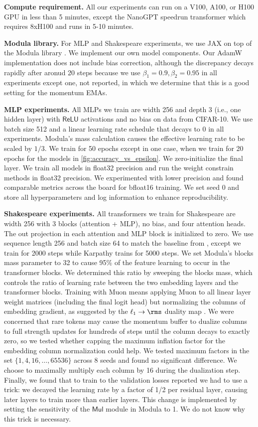 \textbf{Compute requirement.} All our experiments can run on a V100, A100, or H100 GPU in less than 5 minutes, except the NanoGPT speedrun transformer which requires 8xH100 and runs in 5-10 minutes.

\textbf{Modula library.} For MLP and Shakespeare experiments, we use JAX \citep{jax2018github} on top of the Modula library \citep{large2024,modula-docs}. We implement our own model components. Our AdamW implementation does not include bias correction, although the discrepancy decays rapidly after aronud 20 steps because we use $\beta_1 = 0.9, \beta_2 = 0.95$ in all experiments except one, not reported, in which we determine that this is a good setting for the momentum EMAs.

\textbf{MLP experiments.} All MLPs we train are width 256 and depth 3 (i.e., one hidden layer) with $\mathsf{ReLU}$ activations and no bias on data from CIFAR-10. We use batch size 512 and a linear learning rate schedule that decays to 0 in all experiments. Modula's mass calculation causes the effective learning rate to be scaled by $1/3$. We train for 50 epochs except in one case, when we train for 20 epochs for the models in \cref{fig:accuracy_vs_epsilon}. We zero-initialize the final layer. We train all models in float32 precision and run the weight constrain methods in float32 precision. We experimented with lower precision and found comparable metrics across the board for bfloat16 training. We set seed 0 and store all hyperparameters and log information to enhance reproducibility.

\textbf{Shakespeare experiments.} All transformers we train for Shakespeare are width 256 with 3 blocks (attention + MLP), no bias, and four attention heads. The out projection in each attention and MLP block is initialized to zero. We use sequence length 256 and batch size 64 to match the baseline from \citep{karpathy_nanoGPT}, except we train for 2000 steps while Karpathy trains for 5000 steps. We set Modula's blocks mass parameter to 32 to cause 95\% of the feature learning to occur in the transformer blocks. We determined this ratio by sweeping the blocks mass, which controls the ratio of learning rate between the two embedding layers and the transformer blocks. Training with Muon means applying Muon to all linear layer weight matrices (including the final logit head) but normalizing the columns of embedding gradient, as suggested by the $\ell_1 \to \rms$ duality map \citep{bernstein2024duality}. We were concerned that rare tokens may cause the momentum buffer to dualize columns to full strength updates for hundreds of steps until the column decays to exactly zero, so we tested whether capping the maximum inflation factor for the embedding column normalization could help. We tested maximum factors in the set $\{1, 4, 16, \dots, 65536\}$ across 8 seeds and found no significant difference. We choose to maximally multiply each column by 16 during the dualization step. Finally, we found that to train to the validation losses reported we had to use a trick: we decayed the learning rate by a factor of 1/2 per residual layer, causing later layers to train more than earlier layers. This change is implemented by setting the sensitivity of the $\mathsf{Mul}$ module in Modula to 1. We do not know why this trick is necessary.

